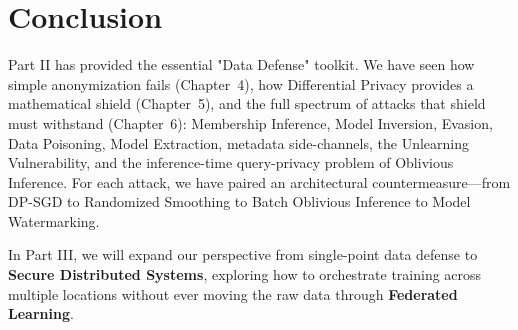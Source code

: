 \section{Conclusion}
\label{sec:conclusion_attacks}

Part II has provided the essential "Data Defense" toolkit. We have seen how simple anonymization fails (Chapter~4), how Differential Privacy provides a mathematical shield (Chapter~5), and the full spectrum of attacks that shield must withstand (Chapter~6): Membership Inference, Model Inversion, Evasion, Data Poisoning, Model Extraction, metadata side-channels, the Unlearning Vulnerability, and the inference-time query-privacy problem of Oblivious Inference. For each attack, we have paired an architectural countermeasure---from DP-SGD to Randomized Smoothing to Batch Oblivious Inference to Model Watermarking.

In Part III, we will expand our perspective from single-point data defense to \textbf{Secure Distributed Systems}, exploring how to orchestrate training across multiple locations without ever moving the raw data through \textbf{Federated Learning}.


